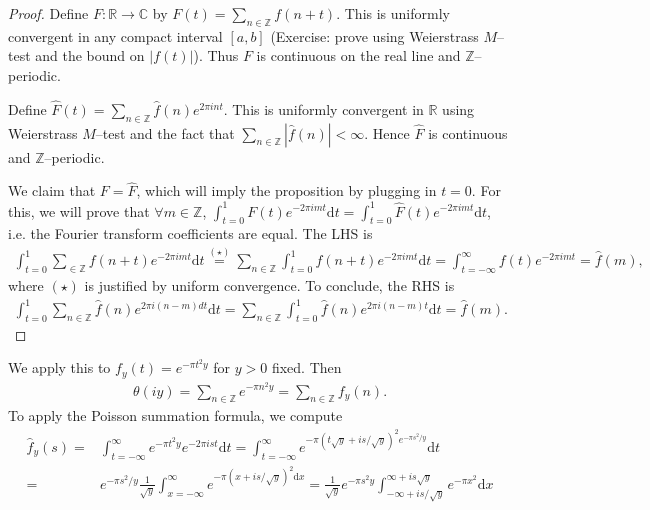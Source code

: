 \documentclass{article}
\theoremstyle{definition}
\begin{document}
\begin{proof}
    Define $F : \mathbb{R} \to \mathbb{C}$ by $F(t) = \sum_{n \in \mathbb{Z}}^{} f(n+t)$. This is uniformly convergent in any compact interval $[a,b]$ (Exercise: prove using Weierstrass $M$--test and the bound on $|f(t)|$). Thus $F$ is continuous on the real line and $\mathbb{Z}$--periodic.
    \vspace{1mm}
     
    Define $\hat{F}(t) = \sum_{n \in \mathbb{Z}}^{} \hat{f}(n)e^{2\pi i n t}$. This is uniformly convergent in $\mathbb{R}$ using Weierstrass $M$--test and the fact that $\sum_{n \in\mathbb{Z}} |\hat{f}(n)| <\infty$. Hence $\hat{F}$ is continuous and $\mathbb{Z}$--periodic.
    \vspace{1mm}
     
    We claim that $F = \hat{F}$, which will imply the proposition by plugging in $t=0$. For this, we will prove that $\forall m \in \mathbb{Z}$, $\int_{t=0}^{1} F(t)e^{-2\pi i m t} \mathrm{d}t = \int_{t=0}^{1} \hat{F}(t)e^{-2\pi i m t} \mathrm{d}t$, i.e. the Fourier transform coefficients are equal. The LHS is \begin{align*}
        \int_{t=0}^{1} \sum_{ \in \mathbb{Z}}^{} f(n+t)e^{-2\pi i m t}\mathrm{d}t \stackrel{(\star)}{=}  \sum_{n \in \mathbb{Z}}^{} \int_{t=0}^{1} f(n+t)e^{-2 \pi i m t}\mathrm{d}t = \int_{t=-\infty}^{\infty} f(t) e^{-2\pi i m t} = \hat{f}(m),
    \end{align*}
    where $(\star)$ is justified by uniform convergence. To conclude, the RHS is 
    \begin{align*}
        \int_{t=0}^{1} \sum_{n \in \mathbb{Z}}^{} \hat{f}(n) e^{2\pi i (n-m)dt}\mathrm{d}t = \sum_{n \in \mathbb{Z}}^{} \int_{t=0}^{1} \hat{f}(n) e^{2\pi i (n-m)t} \mathrm{d}t =\hat{f}(m).
    \end{align*}
\end{proof}
We apply this to $f_y(t) = e^{-\pi t^2 y}$ for $y>0$ fixed. Then 
\begin{align*}
    \theta(iy) = \sum_{n \in \mathbb{Z}}^{} e^{-\pi n^2 y} = \sum_{n \in \mathbb{Z}}^{} f_y(n).
\end{align*}
To apply the Poisson summation formula, we compute 
\begin{align*}
    \hat{f}_y(s) =& \int_{t=-\infty}^{\infty} e^{-\pi t^2 y} e^{-2 \pi i s t}\mathrm{d}t = \int_{t=-\infty}^{\infty} e^{-\pi \left(t\sqrt{y}+is/\sqrt{y}\right)^2 e^{-\pi s^2 /y}}\mathrm{d}t \\
     =& e^{-\pi s^2/y}\frac{1}{\sqrt{y}}\int_{x=-\infty}^{\infty} e^{-\pi(x+is/\sqrt{y})^2\mathrm{d}x} = \frac{1}{\sqrt{y}}e^{-\pi s^2 y} \int_{-\infty +is/\sqrt{y}}^{\infty+is\sqrt{y}} e^{-\pi x^2}\mathrm{d}x
\end{align*}
\end{document}

